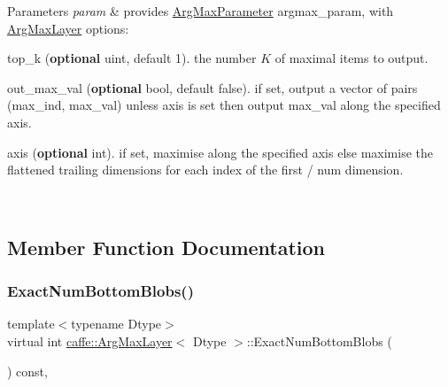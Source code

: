 \begin{DoxyParams}{Parameters}
{\em param} & provides \mbox{\hyperlink{classcaffe_1_1_arg_max_parameter}{Arg\+Max\+Parameter}} argmax\+\_\+param, with \mbox{\hyperlink{classcaffe_1_1_arg_max_layer}{Arg\+Max\+Layer}} options\+:
\begin{DoxyItemize}
\item top\+\_\+k ({\bfseries optional} uint, default 1). the number $ K $ of maximal items to output.
\item out\+\_\+max\+\_\+val ({\bfseries optional} bool, default false). if set, output a vector of pairs (max\+\_\+ind, max\+\_\+val) unless axis is set then output max\+\_\+val along the specified axis.
\item axis ({\bfseries optional} int). if set, maximise along the specified axis else maximise the flattened trailing dimensions for each index of the first / num dimension. 
\end{DoxyItemize}\\
\hline
\end{DoxyParams}


\subsection{Member Function Documentation}
\mbox{\label{classcaffe_1_1_arg_max_layer_a786fb4163cd0a31a564100ce7e4b74b2}} 
\subsubsection{\texorpdfstring{Exact\+Num\+Bottom\+Blobs()}{ExactNumBottomBlobs()}\hspace{0.1cm}{\footnotesize\ttfamily [1/2]}}
{\footnotesize\ttfamily template$<$typename Dtype$>$ \\
virtual int \mbox{\hyperlink{classcaffe_1_1_arg_max_layer}{caffe\+::\+Arg\+Max\+Layer}}$<$ Dtype $>$\+::Exact\+Num\+Bottom\+Blobs (\begin{DoxyParamCaption}{ }\end{DoxyParamCaption}) const\hspace{0.3cm}{\ttfamily [inline]}, {\ttfamily [virtual]}}



